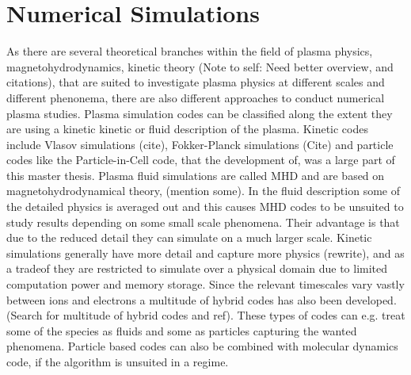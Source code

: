 \section{Numerical Simulations}
	As there are several theoretical branches within the field of plasma physics,
	magnetohydrodynamics, kinetic theory (Note to self:  Need better overview, and citations),
	that are suited to investigate plasma physics at different scales and different phenonema,
	there are also different approaches to conduct numerical plasma studies.
	Plasma simulation codes can be classified along the extent they are using a
	kinetic kinetic or fluid description of the plasma. Kinetic codes include
	Vlasov simulations (cite), Fokker-Planck simulations (Cite) and particle codes like the
	Particle-in-Cell code, that the development of, was a large part of this master thesis.
	Plasma fluid simulations are called MHD and are based on magnetohydrodynamical theory, (mention some).
	In the fluid description some of the detailed physics is averaged out and this causes
	MHD codes to be unsuited to study results depending on some small scale phenomena.
	Their advantage is that due to the reduced detail they can simulate on a much larger scale.
	Kinetic simulations generally have more detail and capture more physics (rewrite),
	and as a tradeof they are restricted to simulate over a physical domain due to
	limited computation power and memory storage.
	Since the relevant timescales vary vastly between ions and electrons a multitude
	of hybrid codes has also been developed. (Search for multitude of hybrid codes and ref).
	These types of codes can e.g. treat some of the species as fluids and some as
	particles capturing the wanted phenomena. Particle based codes can also be combined
	with molecular dynamics code, if the algorithm is unsuited in a regime.
